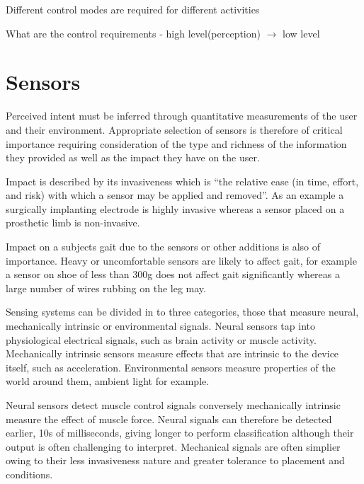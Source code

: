 Different control modes are required for different activities\cite{Simon2013}

What are the control requirements - high level(perception) $\rightarrow$ low level\cite{Tucker2015}




\section{Sensors} %
Perceived intent must be inferred through quantitative measurements of the user and their environment. Appropriate selection of sensors is therefore of critical importance requiring consideration of the type and richness of the information they provided as well as the impact they have on the user.\cite{Tucker2015}

Impact is described by its invasiveness which is ``the relative ease (in time, effort, and risk) with which a sensor may be applied and removed''\cite{Tucker2015}. As an example a surgically implanting electrode is highly invasive whereas a sensor placed on a prosthetic limb is non-invasive.

Impact on a subjects gait due to the sensors or other additions is also of importance. Heavy or uncomfortable sensors are likely to affect gait, for example a sensor on shoe of less than 300g does not affect gait significantly\cite{AbdulRazak2012} whereas a large number of wires rubbing on the leg may.

Sensing systems can be divided in to three categories, those that measure neural, mechanically intrinsic or environmental signals. Neural sensors tap into physiological electrical signals, such as brain activity or muscle activity. Mechanically intrinsic sensors measure effects that are intrinsic to the device itself, such as acceleration. Environmental sensors measure properties of the world around them, ambient light for example.\cite{Koller2018, Tucker2015}

Neural sensors detect muscle control signals conversely mechanically intrinsic measure the effect of muscle force. Neural signals can therefore be detected earlier, 10s of milliseconds\cite{Tucker2015}, giving longer to perform classification although their output is often challenging to interpret. Mechanical signals are often simplier owing to their less invasiveness nature and greater tolerance to placement and conditions.\cite{Koller2018}

